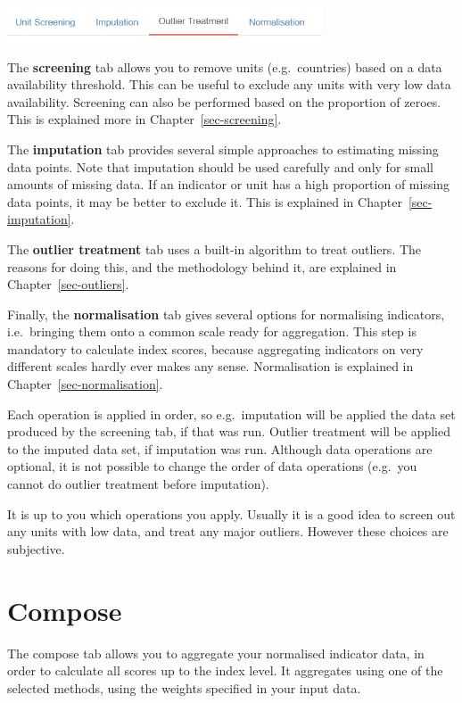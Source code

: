 \documentclass[
  letterpaper,
  DIV=11,
  numbers=noendperiod]{scrreprt}
\begin{document}
\includegraphics[width=0.7\textwidth,height=\textheight]{figs/data_operation_tabs.png}

The \textbf{screening} tab allows you to remove units (e.g.~countries)
based on a data availability threshold. This can be useful to exclude
any units with very low data availability. Screening can also be
performed based on the proportion of zeroes. This is explained more in
Chapter~\ref{sec-screening}.

The \textbf{imputation} tab provides several simple approaches to
estimating missing data points. Note that imputation should be used
carefully and only for small amounts of missing data. If an indicator or
unit has a high proportion of missing data points, it may be better to
exclude it. This is explained in Chapter~\ref{sec-imputation}.

The \textbf{outlier treatment} tab uses a built-in algorithm to treat
outliers. The reasons for doing this, and the methodology behind it, are
explained in Chapter~\ref{sec-outliers}.

Finally, the \textbf{normalisation} tab gives several options for
normalising indicators, i.e.~bringing them onto a common scale ready for
aggregation. This step is mandatory to calculate index scores, because
aggregating indicators on very different scales hardly ever makes any
sense. Normalisation is explained in Chapter~\ref{sec-normalisation}.

Each operation is applied in order, so e.g.~imputation will be applied
the data set produced by the screening tab, if that was run. Outlier
treatment will be applied to the imputed data set, if imputation was
run. Although data operations are optional, it is not possible to change
the order of data operations (e.g.~you cannot do outlier treatment
before imputation).

It is up to you which operations you apply. Usually it is a good idea to
screen out any units with low data, and treat any major outliers.
However these choices are subjective.

\hypertarget{compose}{%
\section{Compose}\label{compose}}

The compose tab allows you to aggregate your normalised indicator data,
in order to calculate all scores up to the index level. It aggregates
using one of the selected methods, using the weights specified in your
input data.
\end{document}
